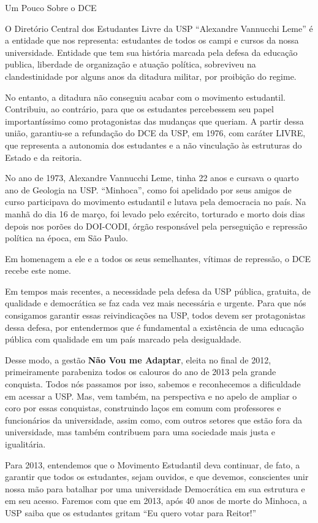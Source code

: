 \begin{secao}{Um Pouco Sobre o DCE}

O Diretório Central dos Estudantes Livre da USP ``Alexandre Vannucchi Leme'' é a
entidade que nos representa: estudantes de todos os campi e cursos da nossa universidade.
Entidade que tem sua história marcada pela defesa da educação publica, liberdade
de organização e atuação política, sobreviveu na clandestinidade por alguns anos
da ditadura militar, por proibição do regime.

No entanto, a ditadura não conseguiu acabar com o movimento estudantil. Contribuiu,
ao contrário, para que os estudantes percebessem seu papel importantíssimo como
protagonistas das mudanças que queriam. A partir dessa união, garantiu-se a
refundação do DCE da USP, em 1976, com caráter LIVRE, que representa a autonomia
dos estudantes e a não vinculação às estruturas do Estado e da reitoria.

No ano de 1973, Alexandre Vannucchi Leme, tinha 22 anos e cursava o quarto ano
de Geologia na USP. ``Minhoca'', como foi apelidado por seus amigos de curso participava
do movimento estudantil e lutava pela democracia no país. Na manhã do dia 16 de março,
foi levado pelo exército, torturado e morto dois dias depois nos porões do DOI-CODI,
órgão responsável pela perseguição e repressão política na época, em São Paulo.

Em homenagem a ele e a todos os seus semelhantes, vítimas de repressão, o DCE recebe este nome.

Em tempos mais recentes, a necessidade pela defesa da USP pública, gratuita, de qualidade
e democrática se faz cada vez mais necessária e urgente. Para que nós consigamos
garantir essas reivindicações na USP, todos devem ser protagonistas dessa defesa,
por entendermos que é fundamental a existência de uma educação pública com qualidade
em um país marcado pela desigualdade.

Desse modo, a gestão {\bf Não Vou me Adaptar}, eleita no final de 2012, primeiramente
parabeniza todos os calouros do ano de 2013 pela grande conquista.
Todos nós passamos por isso, sabemos e reconhecemos a dificuldade em acessar a USP.
Mas, vem também, na perspectiva e no apelo de ampliar o coro por essas conquistas,
construindo laços em comum com professores e funcionários da universidade,
assim como, com outros setores que estão fora da universidade, mas também contribuem
para uma sociedade mais justa e igualitária.

Para 2013, entendemos que o Movimento Estudantil deva continuar, de fato, a garantir
que todos os estudantes, sejam ouvidos, e que devemos, conscientes unir nossa
mão para batalhar por uma universidade Democrática em sua estrutura e em seu acesso.
Faremos com que em 2013, após 40 anos de morte do Minhoca, a USP saiba que os estudantes
gritam ``Eu quero votar para Reitor!''

\end{secao}
